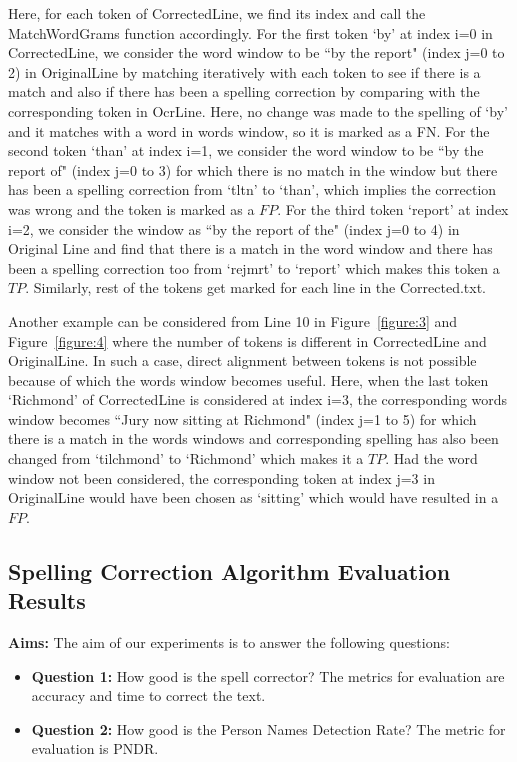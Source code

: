 \documentclass[12pt]{article}
\begin{document}
Here, for each token of CorrectedLine, we find its index and call the MatchWordGrams function accordingly. For the first token `by' at index i=0 in CorrectedLine, we consider the word window to be ``by the report" (index j=0 to 2) in OriginalLine by matching iteratively with each token to see if there is a match and also if there has been a spelling correction by comparing with the corresponding token in OcrLine. Here, no change was made to the spelling of `by' and it matches with a word in words window, so it is marked as a FN. For the second token `than' at index i=1, we consider the word window to be ``by the report of" (index j=0 to 3) for which there is no match in the window but there has been a spelling correction from `tltn' to `than', which implies the correction was wrong and the token is marked as a $FP$. For the third token `report' at index i=2, we consider the window as ``by the report of the" (index j=0 to 4) in Original Line and find that there is a match in the word window and there has been a spelling correction too from `rejmrt' to `report' which makes this token a $TP$. Similarly, rest of the tokens get marked for each line in the Corrected.txt. 

Another example can be considered from Line 10 in Figure~\ref{figure:3} and Figure~\ref{figure:4} where the number of tokens is different in CorrectedLine and OriginalLine. In such a case, direct alignment between tokens is not possible because of which the words window becomes useful. Here, when the last token `Richmond' of CorrectedLine is considered at index i=3, the corresponding words window becomes ``Jury now sitting at Richmond" (index j=1 to 5) for which there is a match in the words windows and corresponding spelling has also been changed from `tilchmond' to `Richmond' which makes it a $TP$. Had the word window not been considered, the corresponding token at index j=3 in OriginalLine would have been chosen as `sitting' which would have resulted in a $FP$. 
   


\subsection{Spelling Correction Algorithm Evaluation Results}
\label{spell:eval}

\noindent \textbf{Aims: }The aim of our experiments is to answer the following questions:
\begin{itemize}
\item \textbf{Question 1: }How good is the spell corrector? The metrics for evaluation are accuracy and time to correct the text.
 
\item \textbf{Question 2: }How good is the Person Names Detection Rate? The metric for evaluation is PNDR. 

\end{itemize}
\end{document}
